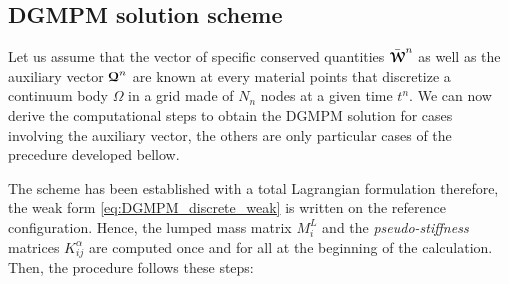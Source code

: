 \subsection{DGMPM solution scheme}
Let us assume that the vector of specific conserved quantities $\bar{{\boldsymbol{\mathcal{W}}}}^n$ as well as the auxiliary vector ${\boldsymbol{\mathcal{Q}}}^n$ are known at every material points that discretize a continuum body $\Omega$ in a grid made of $N_{n}$ nodes at a given time $t^n$. We can now derive the computational steps to obtain the DGMPM solution for cases involving the auxiliary vector, the others are only particular cases of the precedure developed bellow.%

The scheme has been established with a total Lagrangian formulation therefore, the weak form \eqref{eq:DGMPM_discrete_weak} is written on the reference configuration. Hence, the lumped mass matrix $M^L_i$ and the \textit{pseudo-stiffness} matrices $K^\alpha_{ij}$ are computed once and for all at the beginning of the calculation. Then, the procedure follows these steps:
